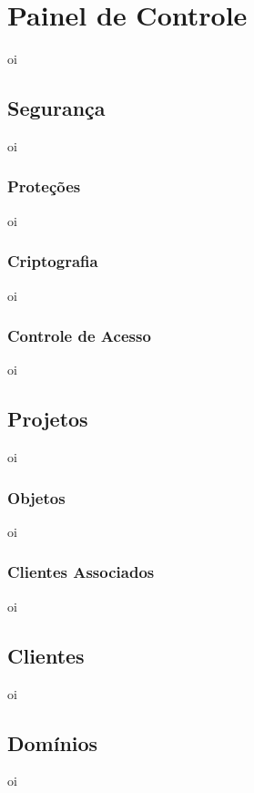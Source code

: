 \section{Painel de Controle}
\label{sec:painel-controle}
oi
    
    \subsection{Segurança}
    \label{sec:seguranca}
    oi
        
        \subsubsection{Proteções}
        \label{sec:protecoes}
        oi
        
        \subsubsection{Criptografia}
        \label{sec:criptografia}
        oi
        
        \subsubsection{Controle de Acesso}
        \label{sec:controle-acesso}
        oi
        
    \subsection{Projetos}
    \label{sec:projetos}
    oi
    
        \subsubsection{Objetos}
        \label{sec:objetos}
        oi
        
        \subsubsection{Clientes Associados}
        \label{sec:clientes-associados}
        oi
    \subsection{Clientes}
    \label{sec:clientes}
    oi
    
    \subsection{Domínios}
    \label{sec:dominios}
    oi

